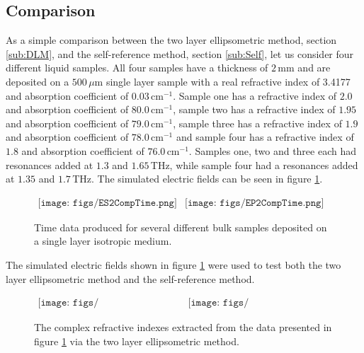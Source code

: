 \subsection{Comparison}
\label{sub:Cmp2}

As a simple comparison between the two layer ellipsometric method, section \ref{sub:DLM}, and the self-reference method, section \ref{sub:Self}, let us consider four different liquid samples. All four samples have a thickness of $2\,$mm and are deposited on a $500\,\mu$m single layer sample with a real refractive index of 3.4177 and absorption coefficient of $0.03\,\text{cm}^{-1}$. Sample one has a refractive index of $2.0$ and absorption coefficient of $80.0\,\text{cm}^{-1}$, sample two has a refractive index of $1.95$ and absorption coefficient of $79.0\,\text{cm}^{-1}$, sample three has a refractive index of $1.9$ and absorption coefficient of $78.0\,\text{cm}^{-1}$ and sample four has a refractive index of $1.8$ and absorption coefficient of $76.0\,\text{cm}^{-1}$. Samples one, two and three each had resonances added at $1.3$ and $1.65\,$THz, while sample four had a resonances added at $1.35$ and $1.7\,$THz. The simulated electric fields can be seen in figure \ref{fig:CompTime}.

\begin{figure}[H]
                \begin{center}$
								\begin{array}{cc}
                \texttt{[image: figs/ES2CompTime.png]}&
                \texttt{[image: figs/EP2CompTime.png]}
								\end{array}$
								\end{center}
	\caption[Time data for several two layer samples]{Time data produced for several different bulk samples deposited on a single layer isotropic medium.}
	\label{fig:CompTime}
\end{figure}

The simulated electric fields shown in figure \ref{fig:CompTime} were used to test both the two layer ellipsometric method and the self-reference method. 

\begin{figure}[H]
                \begin{center}$
								\begin{array}{cc}
                \texttt{[image: figs/TwoLayerEllipsMultiN.png]}&
                \texttt{[image: figs/TwoLayerEllipsMultiK.png]}
								\end{array}$
								\end{center}
	\caption[Complex refractive index extracted from example of a single layer isotropic medium deposited on a bulk isotropic sample]{The complex refractive indexes extracted from the data presented in figure \ref{fig:CompTime} via the two layer ellipsometric method.}
	\label{fig:DoubleExtComp}
\end{figure}

